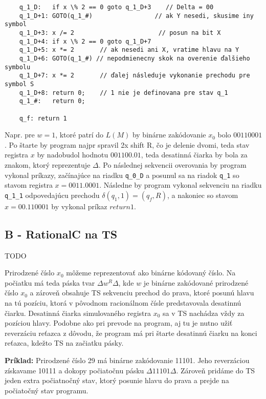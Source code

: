 \documentclass[10pt]{article}
\begin{document}
\begin{verbatim}
    q_1_D:   if x \% 2 == 0 goto q_1_D+3    // Delta = 00
    q_1_D+1: GOTO(q_1_#)                 // ak Y nesedi, skusime iny symbol 
    q_1_D+3: x /= 2                       // posun na bit X
    q_1_D+4: if x \% 2 == 0 goto q_1_D+7 
    q_1_D+5: x *= 2       // ak nesedi ani X, vratime hlavu na Y
    q_1_D+6: GOTO(q_1_#) // nepodmienecny skok na overenie ďalšieho symbolu
    q_1_D+7: x *= 2       // ďalej následuje vykonanie prechodu pre symbol S
    q_1_D+8: return 0;    // 1 nie je definovana pre stav q_1
    q_1_#:   return 0;

    q_f: return 1
    \end{verbatim}
    \normalsize

    Napr. pre $w = 1$, ktoré patrí do $L(M)$ by binárne zakódovanie $x_0$ bolo $00 11 00 01$.
    Po štarte by program najpr spravil 2x shift R, čo je delenie dvomi, teda stav registra $x$
    by nadobudol hodnotu $001100.01$, teda desatinná čiarka by bola za znakom, ktorý reprezentuje
    $\Delta$. Po následnej sekvencii overovania by program vykonal príkazy, začínajúce na riadku
    \texttt{q\_0\_D} a posunul sa na riadok \texttt{q\_1} so stavom registra $x = 00 11.0001$. Následne by program
    vykonal sekvenciu na riadku \texttt{q\_1\_1} odpovedajúcu prechodu $\delta(q_1, 1) = (q_f, R)$,
    a nakoniec so stavom $x = 00.110001$ by vykonal príkaz $return 1$.
    

\subsection*{B - RationalC na TS}
TODO

Prirodzené číslo $x_0$ môžeme reprezentovať ako binárne kódovaný číslo. Na počiatku má teda páska
tvar $\Delta w^R \Delta$, kde $w$ je binárne zakódované prirodzené číslo $x_0$ a zároveň obsahuje TS sekvenciu
prechod do prava, ktoré posunú hlavu na tú pozíciu, ktorá v pôvodnom racionálnom čísle
predstavovala desatinnú čiarku. Desatinná čiarka simulovaného registra $x_0$ sa v TS nachádza vždy
za pozíciou hlavy.
Podobne ako pri prevode na program, aj tu je nutno užiť reverzáciu reťazca z dôvodu, že program má
pri štarte desatinnú čiarku na konci reťazca, kdežto TS na začiatku pásky.

\textbf{Príklad:}
Prirodzené číslo 29 má binárne zakódovanie 11101. Jeho reverzáciou získavame 10111 a dokopy
počiatočnu pásku $\Delta 11101 \Delta$. 
Zároveň pridáme do TS jeden extra počiatnočný stav, ktorý posunie hlavu do prava a prejde na
počiatočný stav programu.
\end{document}
